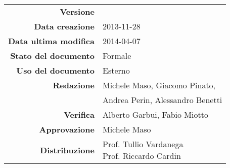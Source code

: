 

\newcommand{\Versione}{\versioneGlossario{}}
\newcommand{\Data}{2013-11-28}
\newcommand{\DataUltimaModifica}{2014-04-07}
\newcommand{\TipoDocumento}{Glossario}
\newcommand{\Lettera}[1]{\huge #1}
\newcommand{\Riga}{\\\rule[2mm]{\textwidth}{0.25mm}}
\newcommand{\Termine}{\emph}
\newcommand{\Inizio}{}

\newcommand{\paginaGlossario}[1]{
\newpage
\setcounter{secnumdepth}{0} %
\section{\Lettera{#1}}
}

\newcommand{\elemento}[2]{
\setcounter{secnumdepth}{0} %
\subsection{#1}
\begin{quote}
{#2}
\end{quote}
}



\begin{center}

\begin{tabular}{r|l}
\textbf{Versione} & \Versione\\
\textbf{Data creazione} & \Data \\
\textbf{Data ultima modifica} & \DataUltimaModifica \\
\textbf{Stato del documento} & Formale \\
\textbf{Uso del documento} & Esterno \\
\textbf{Redazione} & Michele Maso, Giacomo Pinato,\\
                   & Andrea Perin, Alessandro Benetti\\
\textbf{Verifica} & Alberto Garbui, Fabio Miotto \\
\textbf{Approvazione} & Michele Maso \\
\textbf{Distribuzione} & \parbox[t]{4cm}{Prof. Tullio Vardanega \\ Prof. Riccardo Cardin \\ \Prop{} } \\
\end{tabular}
\end{center}
\vspace{.01in}

